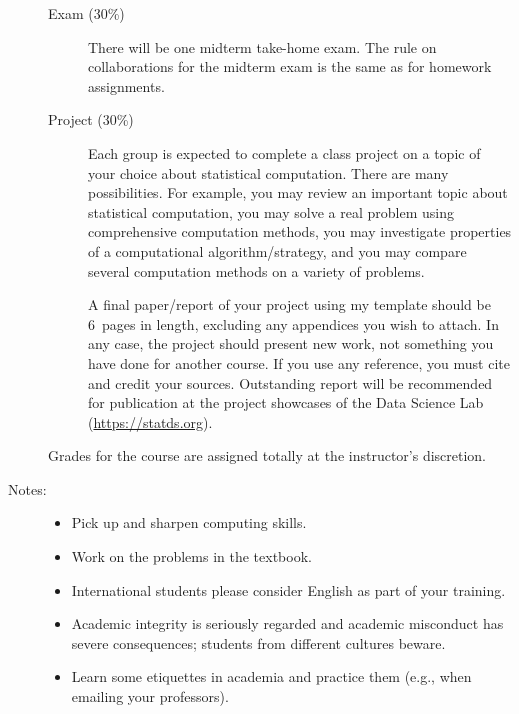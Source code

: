 \documentclass[twocolumn]{article}
\begin{document}
\begin{description}
\begin{description}
\item[Exam (30\%)]
There will be one midterm take-home exam. The rule on collaborations for the
midterm exam is the same as for homework assignments.

\item[Project (30\%)]
Each group is expected to complete a class project on a topic of your choice
about statistical computation. There are many possibilities. For example, you
may review an important topic about statistical computation, you may solve a
real problem using comprehensive computation methods, you may investigate
properties of a computational algorithm/strategy, and you may compare several
computation methods on a variety of problems.

A final paper/report of your project using my template should be 6~pages in
length, excluding any appendices you wish to attach. In any case, the project
should present new work, not something you have done for another course.
If you use any reference, you must cite and credit your sources.
Outstanding report will be recommended for publication at the project showcases
of the Data Science Lab (\url{https://statds.org}).


\end{description}


Grades for the course are assigned totally at the instructor's discretion.

\item[Notes:]\hspace{0pt}
  \begin{itemize}
  \item Pick up and sharpen computing skills. %
  \item Work on the problems in the textbook.
  \item International students please consider English as part of your training.
  \item Academic integrity is seriously regarded and academic misconduct
    has severe consequences; students from different cultures beware.
  \item Learn some etiquettes in academia and practice them (e.g., when
    emailing your professors).
  \end{itemize}

\end{description}
\end{document}
